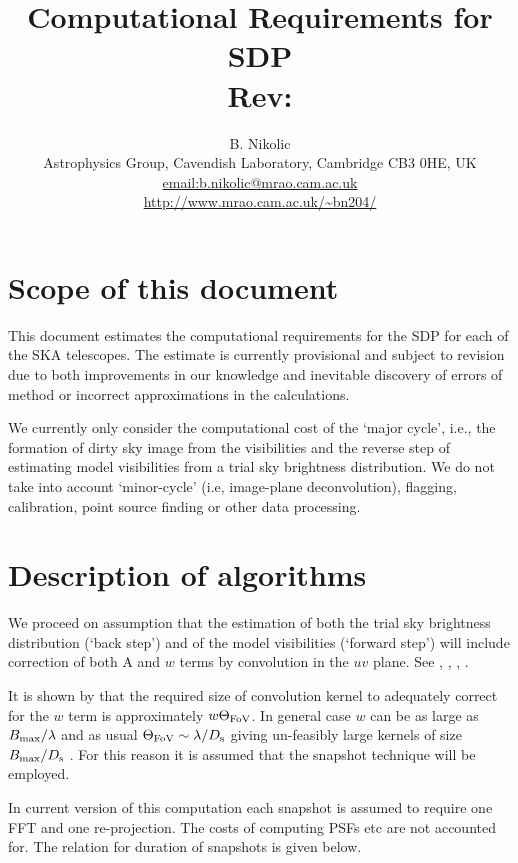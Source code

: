 \documentclass[useAMS,usenatbib,referee]{article}
\title{Computational Requirements for SDP\\
  Rev: }
\author{B. Nikolic\\
  Astrophysics Group, Cavendish Laboratory, Cambridge CB3 0HE, UK
  \\\url{email:b.nikolic@mrao.cam.ac.uk}
 \\\url{http://www.mrao.cam.ac.uk/~bn204/}}
\begin{document}
\maketitle

\tableofcontents

\section{Scope of this document}

This document estimates the computational requirements for the SDP for
each of the SKA telescopes.  The estimate is currently provisional and
subject to revision due to both improvements in our knowledge and
inevitable discovery of errors of method or incorrect approximations
in the calculations.

We currently only consider the computational cost of the `major
cycle', i.e., the formation of dirty sky image from the visibilities
and the reverse step of estimating model visibilities from a trial sky
brightness distribution. We do not take into account `minor-cycle'
(i.e, image-plane deconvolution), flagging, calibration, point source
finding or other data processing.

\section{Description of algorithms}

We proceed on assumption that the estimation of both the trial sky
brightness distribution (`back step') and of the model visibilities
(`forward step') will include correction of both A and $w$ terms by
convolution in the $uv$ plane. See \cite{Cornwell2008-4703511},
\cite{Hymphreys132}, \cite{2012SPIE.8500E..0LC},
\cite{2008A&A...487..419B}.

It is shown by \cite{Hymphreys132} that the required size of
convolution kernel to adequately correct for the $w$ term is
approximately $w \Theta_{\rm FoV}$. In general case $w$ can be as
large as $B_{\rm max}/\lambda$ and as usual $\Theta_{\rm FoV} \sim
\lambda/ D_{\rm s}$ giving un-feasibly large kernels of size $B_{\rm
  max}/D_{\rm s}$ \citep[see discussion in][which is somewhat
difficult to follow but is along these lines]{Kogan2012-VLA164}. For
this reason it is assumed that the snapshot technique will be
employed.

In current version of this computation each snapshot is assumed to
require one FFT and one re-projection. The costs of computing PSFs etc
are not accounted for. The relation for duration of snapshots is given
below. 
\end{document}
